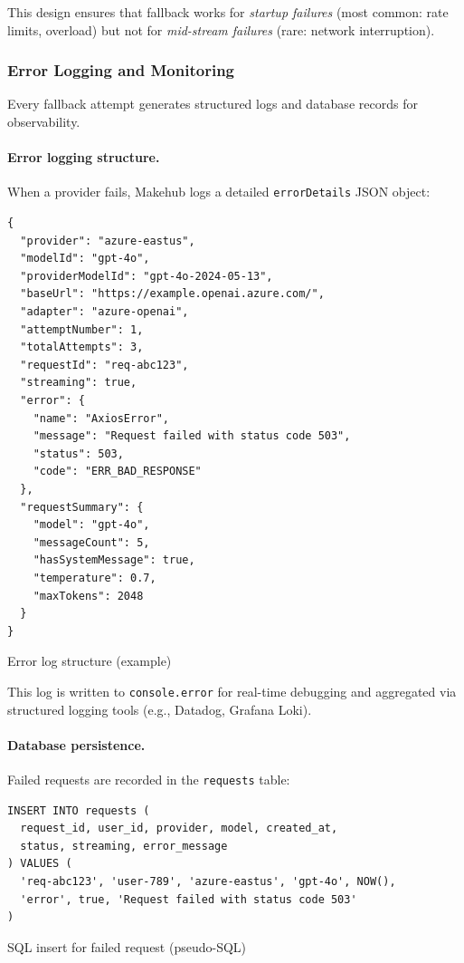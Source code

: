 \documentclass[english]{article}
\begin{document}
This design ensures that fallback works for \emph{startup failures} (most common: rate limits, overload) but not for \emph{mid-stream failures} (rare: network interruption).

\subsubsection{Error Logging and Monitoring}

Every fallback attempt generates structured logs and database records for observability.

\paragraph{Error logging structure.}

When a provider fails, Makehub logs a detailed \texttt{errorDetails} JSON object:

\begin{listing}[H]
\begin{verbatim}
{
  "provider": "azure-eastus",
  "modelId": "gpt-4o",
  "providerModelId": "gpt-4o-2024-05-13",
  "baseUrl": "https://example.openai.azure.com/",
  "adapter": "azure-openai",
  "attemptNumber": 1,
  "totalAttempts": 3,
  "requestId": "req-abc123",
  "streaming": true,
  "error": {
    "name": "AxiosError",
    "message": "Request failed with status code 503",
    "status": 503,
    "code": "ERR_BAD_RESPONSE"
  },
  "requestSummary": {
    "model": "gpt-4o",
    "messageCount": 5,
    "hasSystemMessage": true,
    "temperature": 0.7,
    "maxTokens": 2048
  }
}
\end{verbatim}
\caption{Error log structure (example)}
\end{listing}

This log is written to \texttt{console.error} for real-time debugging and aggregated via structured logging tools (e.g., Datadog, Grafana Loki).

\paragraph{Database persistence.}

Failed requests are recorded in the \texttt{requests} table:

\begin{listing}[H]
\begin{verbatim}
INSERT INTO requests (
  request_id, user_id, provider, model, created_at,
  status, streaming, error_message
) VALUES (
  'req-abc123', 'user-789', 'azure-eastus', 'gpt-4o', NOW(),
  'error', true, 'Request failed with status code 503'
)
\end{verbatim}
\caption{SQL insert for failed request (pseudo-SQL)}
\end{listing}
\end{document}
